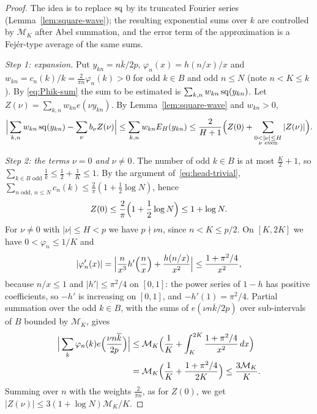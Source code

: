 \begin{proof}
The idea is to replace $\operatorname{sq}$ by its truncated Fourier series (Lemma~\ref{lem:square-wave}); the resulting exponential sums over $k$ are controlled by $\mathcal{M}_K$ after Abel summation, and the error term of the approximation is a Fej\'er-type average of the same sums.

\emph{Step 1: expansion.} Put $y_{kn}=n\overline{k}/2p$, $\varphi_n(x)=h(n/x)/x$ and $w_{kn}=c_n(k)/k=\frac2{\pi n}\varphi_n(k)>0$ for odd
$k\in B$ and odd $n\le N$ (note $n<K\le k$). By \eqref{eq:Phik-sum} the sum to be estimated is
$\sum_{k,n}w_{kn}\operatorname{sq}(y_{kn})$. Let $Z(\nu)=\sum_{k,n}w_{kn}e(\nu y_{kn})$. By Lemma~\ref{lem:square-wave} and $w_{kn}>0$,
\begin{equation}\label{eq:heads-expand}
\Big|\sum_{k,n}w_{kn}\sq(y_{kn})-\sum_\nu b_\nu Z(\nu)\Big|\le\sum_{k,n}w_{kn}E_H(y_{kn})\le\frac2{H+1}\Bigl(Z(0)+
\sum_{\substack{0<|\nu|\le H\\ \nu\text{ even}}}|Z(\nu)|\Bigr).
\end{equation}

\emph{Step 2: the terms $\nu=0$ and $\nu\ne0$.} The number of odd $k\in B$ is at most $\frac K2+1$, so $\sum_{k\in B\text{ odd}}\frac1k\le\frac12+\frac1K\le1$. By the argument of~\eqref{eq:head-trivial},
$\sum_{n\text{ odd},\,n\le N}c_n(k)\le\frac2\pi(1+\frac12\log N)$, hence
\[
Z(0)\le\frac2\pi\Bigl(1+\frac12\log N\Bigr)\le1+\log N.
\]
For $\nu\ne0$ with $|\nu|\le H<p$ we have $p\nmid\nu n$, since $n<K\le p/2$. On $[K,2K]$ we have $0<\varphi_n\le1/K$ and
\[
|\varphi_n'(x)|=\Bigl|\frac n{x^3}h'\Bigl(\frac nx\Bigr)+\frac{h(n/x)}{x^2}\Bigr|\le\frac{1+\pi^2/4}{x^2},
\]
because $n/x\le1$ and $|h'|\le\pi^2/4$ on $[0,1]$: the power series of $1-h$ has positive coefficients, so $-h'$ is increasing on $[0,1]$, and $-h'(1)=\pi^2/4$. Partial summation over the odd $k\in B$, with the sums of $e(\nu n\overline{k}/2p)$ over sub-intervals of $B$ bounded by $\mathcal{M}_K$, gives
\begin{align*}
\Big|\sum_k\varphi_n(k)e\Bigl(\frac{\nu n\overline{k}}{2p}\Bigr)\Big|&\le\mathcal{M}_K\Bigl(\frac1K+\int_K^{2K}\frac{1+\pi^2/4}{x^2}\,dx\Bigr)\\
&=\mathcal{M}_K\Bigl(\frac1K+\frac{1+\pi^2/4}{2K}\Bigr)\le\frac{3\mathcal{M}_K}K.
\end{align*}
Summing over $n$ with the weights $\frac2{\pi n}$, as for $Z(0)$, we get $|Z(\nu)|\le3(1+\log N)\mathcal{M}_K/K$.


\end{proof}

